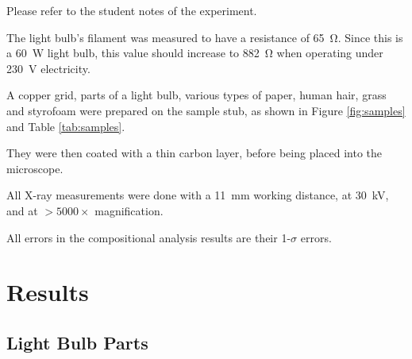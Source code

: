 \documentclass[a4paper]{scrartcl}
\begin{document}
Please refer to the student notes of the experiment.

The light bulb's filament was measured to have a resistance of \SI{65}{\ohm}. Since this is a \SI{60}{\watt} light bulb, this value should increase to \SI{882}{\ohm} when operating under \SI{230}{\volt} electricity.

A copper grid, parts of a light bulb, various types of paper, human hair, grass and styrofoam were prepared on the sample stub, as shown in Figure \ref{fig:samples} and Table \ref{tab:samples}.

They were then coated with a thin carbon layer, before being placed into the microscope.

All X-ray measurements were done with a \SI{11}{\milli\metre} working distance, at \SI{30}{\kilo\volt}, and at \(>5000 \times\) magnification.

All errors in the compositional analysis results are their 1-\(\sigma\) errors.

\section{Results}
\subsection{Light Bulb Parts}
\end{document}
